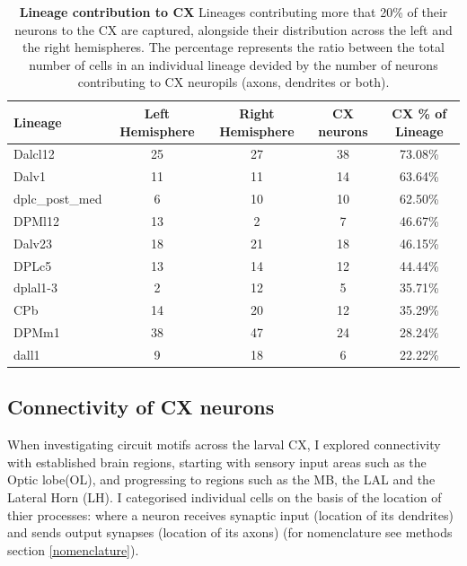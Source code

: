     \begin{table} [!htbp]
    \centering
    \begin{tabular}{|l|c|c|c|c|}
    \hline
    \textbf{Lineage} & \textbf{Left Hemisphere} & \textbf{Right Hemisphere} & \textbf{CX neurons} & \textbf{CX \% of Lineage} \\
    \hline
    Dalcl12 & 25 & 27 & 38 & \cellcolor{forest5}73.08\% \\
    Dalv1 & 11 & 11 & 14 & \cellcolor{forest4}63.64\% \\
    dplc\_post\_med & 6 & 10 & 10 & \cellcolor{forest4}62.50\% \\
    DPMl12 & 13 & 2 & 7 & \cellcolor{forest3}46.67\% \\
    Dalv23 & 18 & 21 & 18 & \cellcolor{forest3}46.15\% \\
    DPLc5 & 13 & 14 & 12 & \cellcolor{forest3}44.44\% \\
    dplal1-3 & 2 & 12 & 5 & \cellcolor{forest2}35.71\% \\
    CPb & 14 & 20 & 12 & \cellcolor{forest2}35.29\% \\
    DPMm1 & 38 & 47 & 24 & \cellcolor{forest1}28.24\% \\
    dall1 & 9 & 18 & 6 & \cellcolor{forest1}22.22\% \\
    \hline
    \end{tabular}
    \caption[Contribution of lineages to CX]{\textbf{Lineage contribution to CX}  Lineages contributing more that 20\% of their neurons to the CX are captured, alongside their distribution across the left and the right hemispheres. The percentage represents the ratio between the total number of cells in an individual lineage devided by the number of neurons contributing to CX neuropils (axons, dendrites or both). }
    \label{cx_percentage}
        \end{table}

    \subsection{Connectivity of CX neurons}
    When investigating circuit motifs across the larval CX, I explored connectivity with established brain regions, starting with sensory input areas such as the Optic lobe(OL), and progressing to regions such as the MB, the LAL and the Lateral Horn (LH).  I categorised individual cells on the basis of the location of thier processes:  where a neuron receives synaptic input (location of its dendrites) and sends output synapses (location of its axons) (for nomenclature see methods section \ref{nomenclature}).

